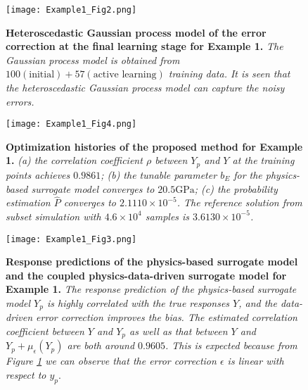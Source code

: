 \documentclass[number,preprint,3p]{elsarticle}
\newcommand{\1}[2]{\mathbb{I}_{#1}\left(#2\right)}
\begin{document}
	\begin{figure}[H]
		\centering
		\texttt{[image: Example1\_Fig2.png]}
		\caption{\textbf{Heteroscedastic Gaussian process model of the error correction at the final learning stage for Example 1.} \textit{The Gaussian process model is obtained from $100(\text{initial})+57(\text{active learning})$ training data. It is seen that the heteroscedastic Gaussian process model can capture the noisy errors.}}
		\label{Fig:Example1_fig2}
	\end{figure}
	
	\begin{figure}[H]
		\centering
		\texttt{[image: Example1\_Fig4.png]}
		\caption{\textbf{Optimization histories of the proposed method for Example 1.} \textit{(a) the correlation coefficient ${\rho}$ between $Y_p$ and $Y$ at the training points achieves $0.9861$; (b) the tunable parameter $b_{E}$ for the physics-based surrogate model converges to $20.5\mathrm{GPa}$; (c) the probability estimation $\hat{P}$ converges to $2.1110\times10^{-5}$. The reference solution from subset simulation with $4.6\times10^{4}$ samples is $3.6130\times10^{-5}$.}}
		\label{Fig:Example1_fig3}
	\end{figure}
	
	\begin{figure}[H]
		\centering
		\texttt{[image: Example1\_Fig3.png]}
		\caption{\textbf{Response predictions of the physics-based surrogate model and the coupled physics-data-driven surrogate model for Example 1.} \textit{The response prediction of the physics-based surrogate model $Y_p$ is highly correlated with the true responses $Y$, and the data-driven error correction improves the bias. The estimated correlation coefficient between $Y$ and $Y_{p}$ as well as that between $Y$ and $Y_{p}+\mu_{\epsilon}(Y_{p})$ are both around $0.9605$. This is expected because from Figure \ref{Fig:Example1_fig2} we can observe that the error correction $\epsilon$ is linear with respect to $y_p$}.}
		\label{Fig:Example1_fig4}
	\end{figure}
	
\end{document}
